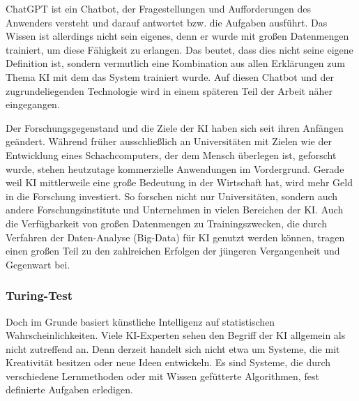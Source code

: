 \documentclass[a4paper,12pt, german]{report}
\begin{document}
ChatGPT ist ein Chatbot, der Fragestellungen und Aufforderungen des Anwenders versteht und darauf antwortet bzw. die Aufgaben ausführt. Das Wissen ist allerdings nicht sein eigenes, denn er wurde mit großen Datenmengen trainiert, um diese Fähigkeit zu erlangen. Das beutet, dass dies nicht seine eigene Definition ist, sondern vermutlich eine Kombination aus allen Erklärungen zum Thema KI mit dem das System trainiert wurde. Auf diesen Chatbot und der zugrundeliegenden Technologie wird in einem späteren Teil der Arbeit näher eingegangen.

Der Forschungsgegenstand und die Ziele der KI haben sich seit ihren Anfängen geändert. Während früher ausschließlich an Universitäten mit Zielen wie der Entwicklung eines Schachcomputers, der dem Mensch überlegen ist, geforscht wurde, stehen heutzutage kommerzielle Anwendungen im Vordergrund. 
Gerade weil KI mittlerweile eine große Bedeutung in der Wirtschaft hat, wird mehr Geld in die Forschung investiert. So forschen nicht nur Universitäten, sondern auch andere Forschungsinstitute und Unternehmen in vielen Bereichen der KI. Auch die Verfügbarkeit von großen Datenmengen zu Trainingszwecken, die durch Verfahren der Daten-Analyse (Big-Data) für KI genutzt werden können, tragen einen großen Teil zu den zahlreichen Erfolgen der jüngeren Vergangenheit und Gegenwart bei. \cite{10}




\subsubsection{Turing-Test}

Doch im Grunde basiert künstliche Intelligenz auf statistischen Wahrscheinlichkeiten. Viele KI-Experten sehen den Begriff der KI allgemein als nicht zutreffend an. Denn derzeit handelt sich nicht etwa um Systeme, die mit Kreativität besitzen oder neue Ideen entwickeln. Es sind Systeme, die durch verschiedene Lernmethoden oder mit Wissen gefütterte Algorithmen, fest definierte Aufgaben erledigen. 
\end{document}
